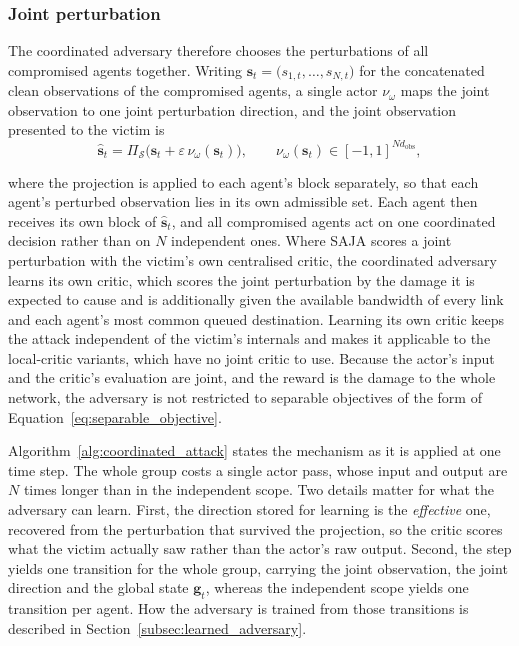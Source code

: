 \subsubsection*{Joint perturbation}

The coordinated adversary therefore chooses the perturbations of all compromised agents
together. Writing $\mathbf{s}_t = \big(s_{1,t}, \dots, s_{N,t}\big)$ for the concatenated
clean observations of the compromised agents, a single actor $\nu_\omega$ maps the joint
observation to one joint perturbation direction, and the joint observation presented to
the victim is
\begin{equation}
  \hat{\mathbf{s}}_t = \Pi_{\mathcal{S}}\big( \mathbf{s}_t + \varepsilon\, \nu_\omega(\mathbf{s}_t) \big),
  \qquad \nu_\omega(\mathbf{s}_t) \in [-1,1]^{N d_{\text{obs}}},
  \label{eq:joint_attack}
\end{equation}

\noindent where the projection is applied to each agent's block separately, so that each
agent's perturbed observation lies in its own admissible set. Each agent then receives
its own block of $\hat{\mathbf{s}}_t$, and all compromised agents act on one coordinated
decision rather than on $N$ independent ones. Where SAJA scores a joint perturbation
with the victim's own centralised critic, the coordinated adversary learns its own
critic, which scores the joint perturbation by the damage it is expected to cause and is
additionally given the available bandwidth of every link and each agent's most common
queued destination. Learning its own critic keeps the attack independent of the victim's
internals and makes it applicable to the local-critic variants, which have no joint
critic to use. Because the actor's input and the critic's evaluation are joint, and the
reward is the damage to the whole network, the adversary is not restricted to separable
objectives of the form of Equation~\eqref{eq:separable_objective}.

Algorithm~\ref{alg:coordinated_attack} states the mechanism as it is applied at one time
step. The whole group costs a single actor pass, whose input and output are $N$ times
longer than in the independent scope. Two details matter for what the adversary can
learn. First, the direction stored for learning is the \emph{effective} one, recovered
from the perturbation that survived the projection, so the critic scores what the victim
actually saw rather than the actor's raw output. Second, the step yields one transition
for the whole group, carrying the joint observation, the joint direction and the global
state $\mathbf{g}_t$, whereas the independent scope yields one transition per agent. How
the adversary is trained from those transitions is described in
Section~\ref{subsec:learned_adversary}.

